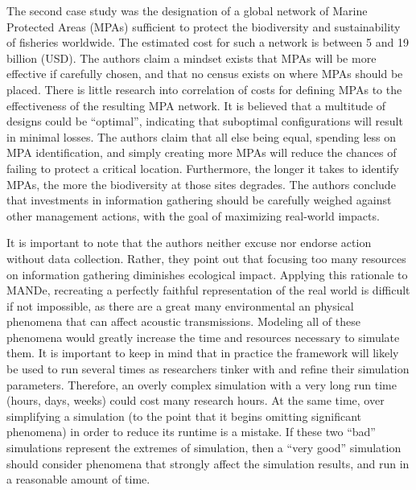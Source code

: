 The second case study was the designation of a global network of Marine Protected Areas (MPAs) sufficient to protect the biodiversity and sustainability of fisheries worldwide.  The estimated cost for such a network is between 5 and 19 billion (USD).  The authors claim a mindset exists that MPAs will be more effective if carefully chosen, and that no census exists on where MPAs should be placed. There is little research into correlation of costs for defining MPAs to the effectiveness of the resulting MPA network.  It is believed that a multitude of designs could be ``optimal'', indicating that suboptimal configurations will result in minimal losses.  The authors claim that all else being equal, spending less on MPA identification, and simply creating more MPAs will reduce the chances of failing to protect a critical location.  Furthermore, the longer it takes to identify MPAs, the more the biodiversity at those sites degrades.  The authors conclude that investments in information gathering should be carefully weighed against other management actions, with the goal of maximizing real-world impacts.

It is important to note that the authors neither excuse nor endorse action without data collection.  Rather, they point out that focusing too many resources on information gathering diminishes ecological impact.  Applying this rationale to MANDe, recreating a perfectly faithful representation of the real world is difficult if not impossible, as there are a great many environmental an physical phenomena that can affect acoustic transmissions.  Modeling all of these phenomena would greatly increase the time and resources necessary to simulate them.  It is important to keep in mind that in practice the framework will likely be used to run several times as researchers tinker with and refine their simulation parameters.  Therefore, an overly complex simulation with a very long run time (hours, days, weeks) could cost many research hours. At the same time, over simplifying a simulation (to the point that it begins omitting significant phenomena) in order to reduce its runtime is a mistake.  If these two ``bad'' simulations represent the extremes of simulation, then a ``very good'' simulation should consider phenomena that strongly affect the simulation results, and run in a reasonable amount of time.  



